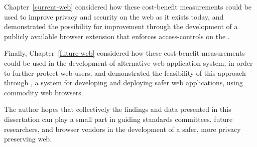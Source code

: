 Chapter~\ref{current-web} considered how these cost-benefit measurements could
be used to improve privacy and security on the web as it exists today, and
demonstrated the possibility for improvement through the development of a
publicly available browser extension that enforces access-controls on
the \WAPI.

Finally, Chapter~\ref{future-web} considered how these cost-benefit
measurements could be used in the development of alternative web application
system, in order to further protect web users, and demonstrated the feasibility
of this approach through \CDF, a system for developing and deploying safer web
applications, using commodity web browsers.

The author hopes that collectively the findings and data presented in this
dissertation can play a small part in guiding standards committees, future
researchers, and browser vendors in the development of a safer, more privacy
preserving web.
